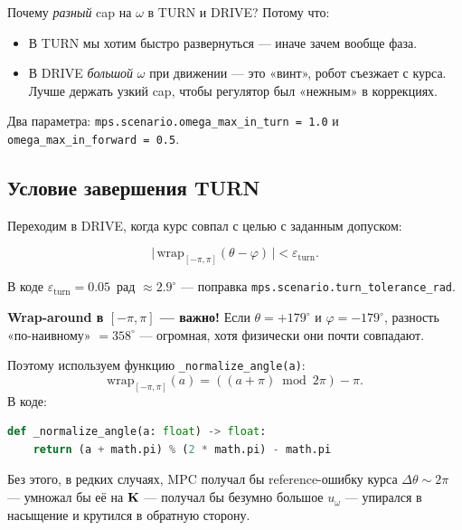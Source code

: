 \begin{notebox}
Почему \emph{разный} cap на $\omega$ в TURN и DRIVE? Потому что:
\begin{itemize}
  \item В TURN мы хотим быстро развернуться --- иначе зачем вообще
        фаза.
  \item В DRIVE \emph{большой} $\omega$ при движении --- это «винт»,
        робот съезжает с курса. Лучше держать узкий cap, чтобы
        регулятор был «нежным» в коррекциях.
\end{itemize}
Два параметра: \texttt{mps.scenario.omega\_max\_in\_turn = 1.0} и
\texttt{omega\_max\_in\_forward = 0.5}.
\end{notebox}

\subsection{Условие завершения TURN}

Переходим в DRIVE, когда курс совпал с целью с заданным допуском:

\begin{equation}
  \big|\,\text{wrap}_{[-\pi, \pi]}(\theta - \varphi)\,\big| < \varepsilon_\text{turn}.
\end{equation}

В коде $\varepsilon_\text{turn} = 0.05$~рад $\approx 2.9^\circ$ ---
поправка \texttt{mps.scenario.turn\_tolerance\_rad}.

\begin{warnbox}
\textbf{Wrap-around в $[-\pi, \pi]$ --- важно!} Если $\theta = +179^\circ$
и $\varphi = -179^\circ$, разность «по-наивному» $= 358^\circ$ --- огромная,
хотя физически они почти совпадают.

Поэтому используем функцию \texttt{\_normalize\_angle(a)}:
\begin{equation}
  \text{wrap}_{[-\pi, \pi]}(a) = ((a + \pi) \bmod 2\pi) - \pi.
\end{equation}
В коде:
\begin{lstlisting}[language=Python]
def _normalize_angle(a: float) -> float:
    return (a + math.pi) % (2 * math.pi) - math.pi
\end{lstlisting}

Без этого, в редких случаях, MPC получал бы reference-ошибку курса
$\Delta\theta \sim 2\pi$ --- умножал бы её на $\mathbf{K}$ --- получал бы
безумно большое $u_\omega$ --- упирался в насыщение и крутился в
обратную сторону.
\end{warnbox}

